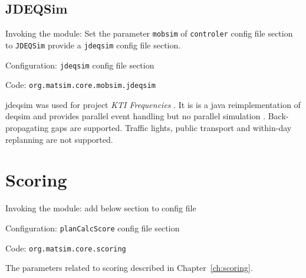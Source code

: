 \subsection{JDEQSim}
\label{sec:jdeqsim}
\begin{compactitem}
\item Invoking the module: Set the parameter \lstinline|mobsim| of \lstinline|controler| config file section to \lstinline|JDEQSim| provide a \lstinline|jdeqsim| config file section.
\item Configuration: \lstinline|jdeqsim| config file section
\item Code: \lstinline|org.matsim.core.mobsim.jdeqsim|
\end{compactitem}

\gls{jdeqsim} \citep[][]{WaraichEtAl_TechRep_IVT_2009, WaraichEtAl_STRC_2009} was used for project \emph{KTI Frequencies} \citep[][]{BalmerEtAl_ResRep_datapuls_2010}. It is is a \gls{java} reimplementation of \gls{deqsim} \citep[][]{WaraichEtAl_STRC_2009, CharyparEtAl_TRR_2007, CharyparEtAl_TRB_2009} and provides parallel event handling but no parallel simulation \citep[][p.11]{BalmerEtAl_ResRep_datapuls_2010}. Back-propagating gaps are supported. Traffic lights, public transport and within-day replanning are not supported.

\section{Scoring}
\label{sec:scoring}
\begin{compactitem}
\item Invoking the module: add below section to config file
\item Configuration: \lstinline|planCalcScore| config file section
\item Code: \lstinline|org.matsim.core.scoring|
\end{compactitem}
%
The parameters related to scoring described in Chapter~\ref{ch:scoring}.


